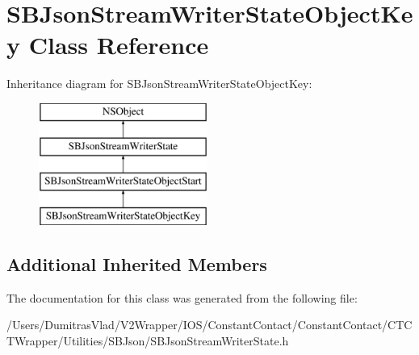 \hypertarget{interface_s_b_json_stream_writer_state_object_key}{\section{S\-B\-Json\-Stream\-Writer\-State\-Object\-Key Class Reference}
\label{interface_s_b_json_stream_writer_state_object_key}
}
Inheritance diagram for S\-B\-Json\-Stream\-Writer\-State\-Object\-Key\-:\begin{figure}[H]
\begin{center}
\leavevmode
\includegraphics[height=4.000000cm]{interface_s_b_json_stream_writer_state_object_key}
\end{center}
\end{figure}
\subsection*{Additional Inherited Members}


The documentation for this class was generated from the following file\-:\begin{DoxyCompactItemize}
\item 
/\-Users/\-Dumitras\-Vlad/\-V2\-Wrapper/\-I\-O\-S/\-Constant\-Contact/\-Constant\-Contact/\-C\-T\-C\-T\-Wrapper/\-Utilities/\-S\-B\-Json/S\-B\-Json\-Stream\-Writer\-State.\-h\end{DoxyCompactItemize}
